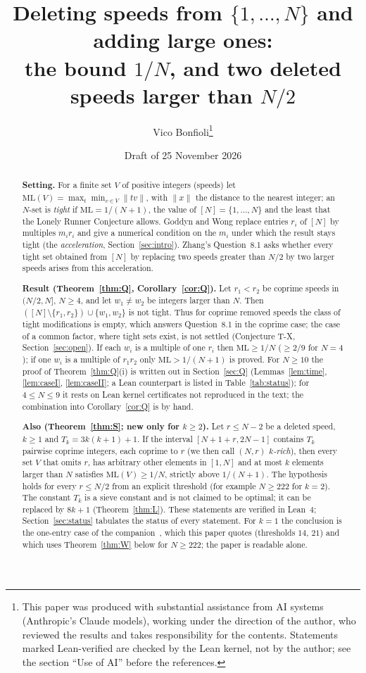 \documentclass[11pt]{article}
\title{Deleting speeds from $\{1,\dots,N\}$ and adding large ones:\\ the bound $1/N$, and two deleted speeds larger than $N/2$}
\author{Vico Bonfioli\thanks{This paper was produced with substantial assistance from AI systems (Anthropic's Claude models), working under the direction of the author, who reviewed the results and takes responsibility for the contents. Statements marked Lean-verified are checked by the Lean kernel, not by the author; see the section ``Use of AI'' before the references.}}
\date{Draft of 25 November 2026}
\theoremstyle{definition}
\theoremstyle{remark}
\newcommand{\nd}[1]{\lVert #1\rVert}
\newcommand{\ML}{\mathrm{ML}}
\begin{document}
\maketitle

\begin{abstract}
\noindent\textbf{Setting.} For a finite set $V$ of positive integers (speeds) let $\ML(V)=\max_t\min_{v\in V}\nd{tv}$, with $\nd{x}$ the distance to the nearest integer; an $N$-set is \emph{tight} if $\ML=1/(N+1)$, the value of $[N]=\{1,\dots,N\}$ and the least that the Lonely Runner Conjecture allows. Goddyn and Wong replace entries $r_i$ of $[N]$ by multiples $m_ir_i$ and give a numerical condition on the $m_i$ under which the result stays tight (the \emph{acceleration}, Section~\ref{sec:intro}). Zhang's Question~8.1 asks whether every tight set obtained from $[N]$ by replacing two speeds greater than $N/2$ by two larger speeds arises from this acceleration.

\medskip\noindent\textbf{Result (Theorem~\ref{thm:Q}, Corollary~\ref{cor:Q}).} Let $r_1<r_2$ be coprime speeds in $(N/2,N]$, $N\ge4$, and let $w_1\ne w_2$ be integers larger than $N$. Then $([N]\setminus\{r_1,r_2\})\cup\{w_1,w_2\}$ is not tight. Thus for coprime removed speeds the class of tight modifications is empty, which answers Question~8.1 in the coprime case; the case of a common factor, where tight sets exist, is not settled (Conjecture T-X, Section~\ref{sec:open}). If each $w_i$ is a multiple of one $r_i$ then $\ML\ge1/N$ ($\ge2/9$ for $N=4$); if one $w_i$ is a multiple of $r_1r_2$ only $\ML>1/(N+1)$ is proved. For $N\ge10$ the proof of Theorem~\ref{thm:Q}(i) is written out in Section~\ref{sec:Q} (Lemmas~\ref{lem:time}, \ref{lem:caseI}, \ref{lem:caseII}; a Lean counterpart is listed in Table~\ref{tab:status}); for $4\le N\le9$ it rests on Lean kernel certificates not reproduced in the text; the combination into Corollary~\ref{cor:Q} is by hand.

\medskip\noindent\textbf{Also (Theorem~\ref{thm:S}; new only for $k\ge2$).} Let $r\le N-2$ be a deleted speed, $k\ge1$ and $T_k=3k(k+1)+1$. If the interval $[N+1+r,2N-1]$ contains $T_k$ pairwise coprime integers, each coprime to $r$ (we then call $(N,r)$ \emph{$k$-rich}), then every set $V$ that omits $r$, has arbitrary other elements in $[1,N]$ and at most $k$ elements larger than $N$ satisfies $\ML(V)\ge1/N$, strictly above $1/(N+1)$. The hypothesis holds for every $r\le N/2$ from an explicit threshold (for example $N\ge222$ for $k=2$). The constant $T_k$ is a sieve constant and is not claimed to be optimal; it can be replaced by $8k+1$ (Theorem~\ref{thm:L}). These statements are verified in Lean~4; Section~\ref{sec:status} tabulates the status of every statement. For $k=1$ the conclusion is the one-entry case of the companion~\cite{A1}, which this paper quotes (thresholds $14$, $21$) and which uses Theorem~\ref{thm:W} below for $N\ge222$; the paper is readable alone.
\end{abstract}
\end{document}
